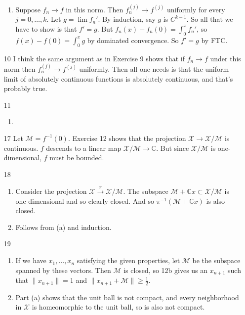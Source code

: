 \documentclass{article}
\newcommand\CC{\mathbb C}
\newcommand\X{\mathcal X}
\newcommand\M{\mathcal M}
\begin{document}
\begin{enumerate}
\begin{enumerate}
         \item Suppose $f_n \to f$ in this norm. Then $f_n^{(j)} \to f^{(j)}$
            uniformly for every $j = 0,\dotsc,k$. Let $g = \lim f_n'$. By
            induction, say $g$ is $C^{k-1}$. So all that we have to show is that
            $f' = g$. But $f_n(x) - f_n(0) = \int_0^x f_n'$, so $f(x) - f(0) =
            \int_0^x g$ by dominated convergence. So $f' = g$ by FTC.
      \end{enumerate}

   \item[10] I think the same argument as in Exercise 9 shows that if $f_n \to
      f$ under this norm then $f_n^{(j)} \to f^{(j)}$ uniformly. Then all one
      needs is that the uniform limit of absolutely continuous functions is
      absolutely continuous, and that's probably true.

   \item[11] \begin{enumerate}
         \item 
      \end{enumerate}

   \item[17] Let $\M = f^{-1}(0)$. Exercise 12 shows that the projection $\X \to
      \X/\M$ is continuous. $f$ descends to a linear map $\X/\M \to \CC$. But
      since $\X/\M$ is one-dimensional, $f$ must be bounded.

   \item[18] \begin{enumerate}
         \item Consider the projection $\X \xrightarrow\pi \X/\M$. The subspace
            $\M + \CC x \subset \X/\M$ is one-dimensional and so clearly closed.
            And so $\pi^{-1}(\M + \CC x)$ is also closed.
         \item Follows from (a) and induction.
      \end{enumerate}

   \item[19] \begin{enumerate}
         \item If we have $x_1,\dotsc,x_n$ satisfying the given properties, let
            $\M$ be the subspace spanned by these vectors. Then $\M$ is closed,
            so 12b gives us an $x_{n+1}$ such that $\|x_{n+1}\| = 1$ and
            $\|x_{n+1} + \M\| \geq \frac12$.

         \item Part (a) shows that the unit ball is not compact, and every
            neighborhood in $\X$ is homeomorphic to the unit ball, so is also
            not compact.


\end{enumerate}
\end{enumerate}
\end{document}
